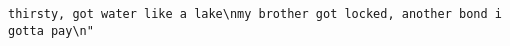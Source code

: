 \documentclass[]{article}
\begin{document}
\begin{verbatim}
thirsty, got water like a lake\nmy brother got locked, another bond i gotta pay\n"                                                                                                                                                                                                                                                                                                                                                                                                                                                                                                                                                                                                                                                                                                                                                                                                                                                                                                                                                                                                                                                                                                                                                                                                                                                                                                                                                                                                                                                                                                                                                                                                                                                                                                                                                                                                                                                                                                                                                                                                                                                                                                                                                                                                                                                                                                                                                                                                                                                                                                                                                                                                                                                                                                                                                                                                                                                                                                             

\end{verbatim}
\end{document}

